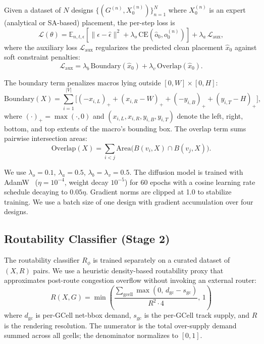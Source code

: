 \documentclass[lettersize,journal]{IEEEtran}
\begin{document}
Given a dataset of $N$ designs $\{(G^{(n)}, X^{(n)}_0)\}_{n=1}^N$ where $X^{(n)}_0$ is an expert (analytical or SA-based) placement, the per-step loss is
\begin{equation}
\label{eq:total_loss}
\mathcal{L}(\theta) = \mathbb{E}_{n, t, \epsilon}\!\!\left[ \|\epsilon - \hat\epsilon\|^2 + \lambda_o\, \text{CE}(\hat{o}_0, o^{(n)}_0) \right] + \lambda_a\, \mathcal{L}_\text{aux},
\end{equation}
where the auxiliary loss $\mathcal{L}_\text{aux}$ regularizes the predicted clean placement $\hat{x}_0$ against soft constraint penalties:
\begin{equation}
\label{eq:aux_loss}
\mathcal{L}_\text{aux} = \lambda_b\, \text{Boundary}(\hat{x}_0) + \lambda_v\, \text{Overlap}(\hat{x}_0).
\end{equation}

The boundary term penalizes macros lying outside $[0, W] \times [0, H]$:
\begin{equation}
\label{eq:boundary_def}
\text{Boundary}(X) = \sum_{i=1}^{|V|} \big[\!(-x_{i,L})_+ + (x_{i,R} - W)_+ + (-y_{i,B})_+ + (y_{i,T} - H)_+ \big],
\end{equation}
where $(\cdot)_+ = \max(\cdot, 0)$ and $(x_{i,L}, x_{i,R}, y_{i,B}, y_{i,T})$ denote the left, right, bottom, and top extents of the macro's bounding box. The overlap term sums pairwise intersection areas:
\begin{equation}
\label{eq:overlap_def}
\text{Overlap}(X) = \sum_{i < j} \text{Area}\!\big(B(v_i, X) \cap B(v_j, X)\big).
\end{equation}

We use $\lambda_o = 0.1$, $\lambda_a = 0.5$, $\lambda_b = \lambda_v = 0.5$. The diffusion model is trained with AdamW~\cite{loshchilov2019adamw} ($\eta = 10^{-4}$, weight decay $10^{-5}$) for 60 epochs with a cosine learning rate schedule decaying to $0.05\eta$. Gradient norms are clipped at 1.0 to stabilize training. We use a batch size of one design with gradient accumulation over four designs.

\subsection{Routability Classifier (Stage 2)}

The routability classifier $R_\phi$ is trained separately on a curated dataset of $(X, R)$ pairs. We use a heuristic density-based routability proxy that approximates post-route congestion overflow without invoking an external router:
\begin{equation}
\label{eq:routability_heuristic}
R(X, G) = \min\!\left(\!\frac{\sum_{\text{gcell}}\!\max(0,\, d_\text{gc} - s_\text{gc})}{R^2 \cdot 4},\, 1\right)
\end{equation}
where $d_\text{gc}$ is per-GCell net-bbox demand, $s_\text{gc}$ is the per-GCell track supply, and $R$ is the rendering resolution. The numerator is the total over-supply demand summed across all gcells; the denominator normalizes to $[0, 1]$.
\end{document}
